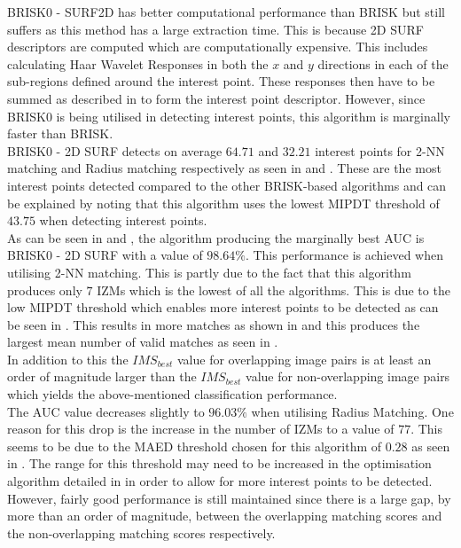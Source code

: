 \documentclass[11pt]{report}
\begin{document}
BRISK0 - SURF2D has better computational performance than BRISK but still suffers as this method has a large extraction time. This is because 2D SURF descriptors are computed which are computationally expensive. This includes calculating Haar Wavelet Responses in both the $x$ and $y$ directions in each of the sub-regions defined around the interest point. These responses then have to be summed as described in  to form the interest point descriptor. However, since BRISK0 is being utilised in detecting interest points, this algorithm is marginally faster than BRISK.\\

BRISK0 - 2D SURF detects on average $64.71$ and $32.21$ interest points for 2-NN matching and Radius matching respectively as seen in  and . These are the most interest points detected compared to the other BRISK-based algorithms and can be explained by noting that this algorithm uses the lowest MIPDT threshold of $43.75$ when detecting interest points. \\

As can be seen in  and , the algorithm producing the marginally best AUC is BRISK0 - 2D SURF with a value of $98.64\%$. This performance is achieved when utilising 2-NN matching. This is partly due to the fact that this algorithm produces only $7$ IZMs which is the lowest of all the algorithms. This is due to the low MIPDT threshold which enables more interest points to be detected as can be seen in . This results in more matches as shown in  and this produces the largest mean number of valid matches as seen in .\\

In addition to this the $IMS_{best}$ value for overlapping image pairs is at least an order of magnitude larger than the $IMS_{best}$ value for non-overlapping image pairs which yields the above-mentioned classification performance. \\

The AUC value decreases slightly to $96.03\%$ when utilising Radius Matching. One reason for this drop is the increase in the number of IZMs to a value of $77$. This seems to be due to the MAED threshold chosen for this algorithm of $0.28$ as seen in . The range for this threshold may need to be increased in the optimisation algorithm detailed in  in order to allow for more interest points to be detected. However, fairly good performance is still maintained since there is a large gap, by more than an order of magnitude, between the overlapping matching scores and the non-overlapping matching scores respectively. \\
\end{document}
